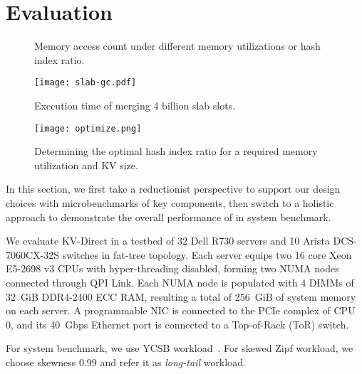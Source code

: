\section{Evaluation}

\begin{figure}[t]
\begin{minipage}[t]{0.5\textwidth}
\caption{Memory access count under different memory utilizations or hash index ratio.}
\end{minipage}
\vspace{-10pt}
\end{figure}

\begin{figure}[t]
\centering
\texttt{[image: slab-gc.pdf]}
\caption{Execution time of merging 4 billion slab slots.}
\label{fig:slab-garbage-collection}
\vspace{-8pt}
\end{figure}

\begin{figure}[t]
\centering
\texttt{[image: optimize.png]}
\caption{Determining the optimal hash index ratio for a required memory utilization and KV size.}
\label{fig:hashline-ratio}
\vspace{-8pt}
\end{figure}

\label{sec:evaluation}
In this section, we first take a reductionist perspective to support our design choices with microbenchmarks of key components, then switch to a holistic approach to demonstrate the overall performance of \oursys{} in system benchmark.

\label{sec:evaluation-setup}
We evaluate KV-Direct in a testbed of 32 Dell R730 servers and 10 Arista DCS-7060CX-32S switches in fat-tree topology.
Each server equips two 16 core Xeon E5-2698 v3 CPUs with hyper-threading disabled, forming two NUMA nodes connected through QPI Link. Each NUMA node is populated with 4 DIMMs of 32~GiB DDR4-2400 ECC RAM, resulting a total of 256~GiB of system memory on each server.
A programmable NIC is connected to the PCIe complex of CPU 0, and its 40~Gbps Ethernet port is connected to a Top-of-Rack (ToR) switch.

For system benchmark, we use YCSB workload~\cite{cooper2010benchmarking}.
For skewed Zipf workload, we choose skewness 0.99 and refer it as \textit{long-tail} workload.

